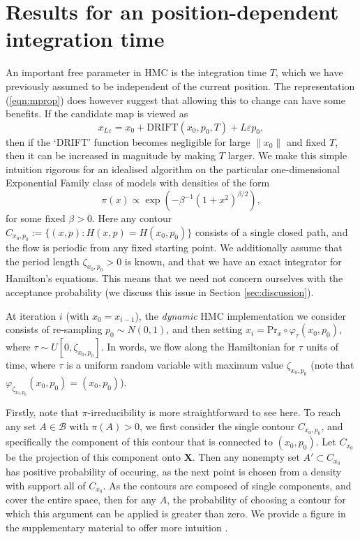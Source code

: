\documentclass[bj,numbers,noshowframe]{imsart}
\newcommand{\X}{\mathbf{X}}
\newcommand{\B}{\mathcal{B}}
\newcommand{\e}{\varepsilon}
\theoremstyle{definition}
\theoremstyle{plain}
\theoremstyle{definition}
\begin{document}
\section{Results for an position-dependent integration time}
\label{sec:dynamic}

An important free parameter in HMC is the integration time $T$, which we have previously assumed to be independent of the current position.  The representation (\ref{eqn:mprop}) does however suggest that allowing this to change can have some benefits.  If the candidate map is viewed as
\[
x_{L\e} = x_0 + \text{DRIFT}(x_0,p_0,T) + L\e p_0,
\]
then if the `DRIFT' function becomes negligible for large $\|x_0\|$ and fixed $T$, then it can be increased in magnitude by making $T$ larger.  We make this simple intuition rigorous for an idealised algorithm on the particular one-dimensional Exponential Family class of models with densities of the form
\begin{equation} \label{eqn:efsmooth}
\pi(x) \propto \exp \left( - \beta^{-1} (1+x^2) ^{\beta / 2} \right),
\end{equation}
for some fixed $\beta>0$.  Here any contour $C_{x_0,p_0} := \{ (x,p) : H(x,p) = H(x_0,p_0)\}$ consists of a single closed path, and the flow is periodic from any fixed starting point.  We additionally assume that the period length $\zeta_{x_0,p_0} >0$ is known, and that we have an exact integrator for Hamilton's equations.  This means that we need not concern ourselves with the acceptance probability (we discuss this issue in Section \ref{sec:discussion}).

At iteration $i$ (with $x_0 = x_{i-1}$), the \emph{dynamic} HMC implementation we consider consists of re-sampling $p_0 \sim N(0,1)$, and then setting $x_i = \text{Pr}_x \circ \varphi_{\tau}(x_0,p_0)$, where $\tau \sim U[0,\zeta_{x_0,p_0}]$.  In words, we flow along the Hamiltonian for $\tau$ units of time, where $\tau$ is a uniform random variable with maximum value $\zeta_{x_0,p_0}$ (note that $\varphi_{\zeta_{x_0,p_0}}(x_0,p_0) = (x_0,p_0)$).

Firstly, note that $\pi$-irreducibility is more straightforward to see here.  To reach any set $A \in \B$ with $\pi(A) > 0$, we first consider the single contour $C_{x_0,p_0}$, and specifically the component of this contour that is connected to $(x_0,p_0)$.  Let $C_{x_0}$ be the projection of this component onto $\X$.  Then any nonempty set $A' \subset C_{x_0}$ has positive probability of occuring, as the next point is chosen from a density with support all of $C_{x_0}$.  As the contours are composed of single components, and cover the entire space, then for any $A$, the probability of choosing a contour for which this argument can be applied is greater than zero.  We provide a figure in the supplementary material to offer more intuition \citep{supplement}.
\end{document}
